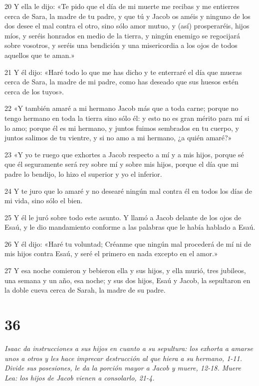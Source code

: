 \par 20 Y ella le dijo: «Te pido que el día de mi muerte me recibas y me entierres cerca de Sara, la madre de tu padre, y que tú y Jacob os améis y ninguno de los dos desee el mal contra el otro, sino sólo amor mutuo, y (así) prosperaréis, hijos míos, y seréis honrados en medio de la tierra, y ningún enemigo se regocijará sobre vosotros, y seréis una bendición y una misericordia a los ojos de todos aquellos que te aman.»
\par 21 Y él dijo: «Haré todo lo que me has dicho y te enterraré el día que mueras cerca de Sara, la madre de mi padre, como has deseado que sus huesos estén cerca de los tuyos».
\par 22 «Y también amaré a mi hermano Jacob más que a toda carne; porque no tengo hermano en toda la tierra sino sólo él: y esto no es gran mérito para mí si lo amo; porque él es mi hermano, y juntos fuimos sembrados en tu cuerpo, y juntos salimos de tu vientre, y si no amo a mi hermano, ¿a quién amaré?»
\par 23 «Y yo te ruego que exhortes a Jacob respecto a mí y a mis hijos, porque sé que él seguramente será rey sobre mí y sobre mis hijos, porque el día que mi padre lo bendijo, lo hizo el superior y yo el inferior.
\par 24 Y te juro que lo amaré y no desearé ningún mal contra él en todos los días de mi vida, sino sólo el bien.
\par 25 Y él le juró sobre todo este asunto. Y llamó a Jacob delante de los ojos de Esaú, y le dio mandamiento conforme a las palabras que le había hablado a Esaú.
\par 26 Y él dijo: «Haré tu voluntad; Créanme que ningún mal procederá de mí ni de mis hijos contra Esaú, y seré el primero en nada excepto en el amor.»
\par 27 Y esa noche comieron y bebieron ella y sus hijos, y ella murió, tres jubileos, una semana y un año, esa noche; y sus dos hijos, Esaú y Jacob, la sepultaron en la doble cueva cerca de Sarah, la madre de su padre.

\chapter{36}

\par \textit{Isaac da instrucciones a sus hijos en cuanto a su sepultura: los exhorta a amarse unos a otros y les hace imprecar destrucción al que hiera a su hermano, 1-11. Divide sus posesiones, le da la porción mayor a Jacob y muere, 12-18. Muere Lea: los hijos de Jacob vienen a consolarlo, 21-4.}

